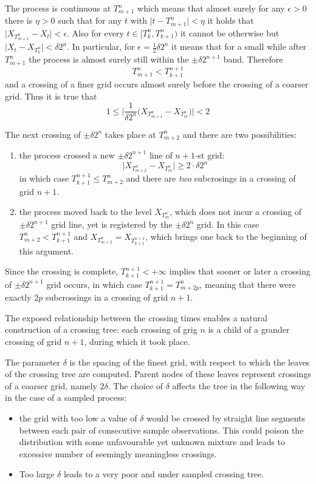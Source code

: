 \documentclass[a4paper]{report}
\begin{document}
The process is continuous at $T^n_{m+1}$ which means that almost surely for any
$\epsilon>0$ there is $\eta>0$ such that for any $t$ with $\bigl|t - T^n_{m+1}\bigr| < \eta$
it holds that $\bigl|X_{T^n_{m+1}} - X_t \bigl| < \epsilon$. Also for every $t \in \bigl[ T^n_k, T^n_{k+1} \bigr)$
it cannot be otherwise but $\big | X_t - X_{T^n_k} \big | < \delta 2^n$.  In particular,
for $\epsilon = \frac{1}{2}\delta 2^n$ it means that for a small while after $T^n_{m+1}$
the process is almost surely still within the $\pm \delta 2^{n+1}$ band. Therefore
\[ T^n_{m+1} < T^{n+1}_{k+1} \]
and a crossing of a finer grid occurs almost surely before the crossing of a coarser
grid. Thus it is true that 
\[ 1 \leq \biggl| \frac{1}{\delta 2^n} \bigl( X_{T^n_{m+1}} - X_{T^n_m} \bigr) \biggr| < 2 \]

\noindent The next crossing of $\pm\delta 2^n$ takes place at $T^n_{m+2}$ and there
are two possibilities:
\begin{enumerate}
	\item the process crossed a new $\pm\delta 2^{n+1}$ line of $n+1$-st grid: 
	\[ \big|X_{T^n_{m+2}} - X_{T^n_m}\big|\geq 2\cdot\delta 2^n\] in which case
	$T^{n+1}_{k+1}\leq T^n_{m+2}$ and there are \emph{two} subcrosings in a crossing
	of grid $n+1$.
	\item the process moved back to the level $X_{T^n_m}$, which does not incur a
	crossing of $\pm\delta 2^{n+1}$ grid line, yet is registered by the $\pm\delta 2^n$
	grid. In this case $T^n_{m+2} < T^{n+1}_{k+1}$ and $X_{T^n_{m+2}} = X_{T^{n+1}_{k+1}}$,
	which brings one back to the beginning of this argument.
\end{enumerate}

Since the crossing is complete, $T^{n+1}_{k+1} < +\infty$ implies that sooner or later
a crossing of $\pm\delta 2^{n+1}$ grid occurs, in which case $T^{n+1}_{k+1} = T^n_{m+2p}$,
meaning that there were exactly $2p$ subcrossings in a crossing of grid $n+1$.

The exposed relationship between the crossing times enables a natural construction
of a crossing tree: each crossing of grig $n$ is a child of a grander crossing of
grid $n+1$, during which it took place.

The parameter $\delta$ is the spacing of the finest grid, with respect to which
the leaves of the crossing tree are computed. Parent nodes of these leaves represent
crossings of a coarser grid, namely $2\delta$. The choice of $\delta$ affects the tree
in the following way in the case of a sampled process:
\begin{itemize}
	\item the grid with too low a value of $\delta$ would be crossed by straight
	line segments between each pair of consecutive sample observations. This could
	poison the distribution with some unfavourable yet unknown mixture and leads
	to excessive number of seemingly meaningless crossings.
	\item Too large $\delta$ leads to a very poor and under sampled crossing tree.
\end{itemize}
\end{document}
